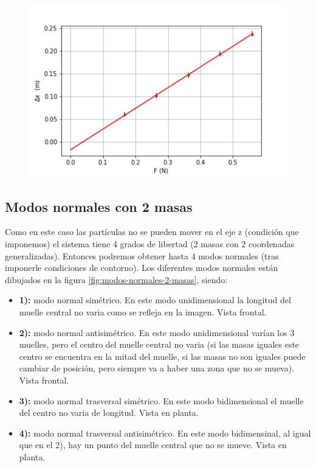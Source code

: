 \documentclass[12pt,a4paper]{article}
\begin{document}
\begin{figure}[h!] \centering
\includegraphics[scale=0.68]{plot4.png}
\end{figure}


\newpage

\subsection{Modos normales con 2 masas}
Como en este caso las partículas no se pueden mover en el eje z (condición que imponemos) el sistema tiene 4 grados de libertad (2 masas con 2 coordenadas generalizadas). Entonces podremos obtener hasta 4 modos normales (tras imponerle condiciones de contorno). Los diferentes modos normales están dibujados en la figura \ref{fig:modos-normales-2-masas}, siendo:
\begin{itemize}
\item \textbf{1):} modo normal simétrico. En este modo unidimensional la longitud del muelle central no varia como se refleja en la imagen. Vista frontal.
\item \textbf{2):} modo normal antisimétrico. En este modo unidimensional varían los 3 muelles, pero el centro del muelle central no varia (si las masas iguales este centro se encuentra en la mitad del muelle, si las masas no son iguales puede cambiar de posición, pero siempre va a haber una zona que no se mueva). Vista frontal.
\item \textbf{3):} modo normal trasversal simétrico. En este modo bidimensional el muelle del centro no varia de longitud. Vista en planta. 
\item  \textbf{4):} modo normal trasversal antisimétrico. En este modo bidimensinal, al igual que en el 2), hay un punto del muelle central que no se mueve. Vista en planta.
\end{itemize}
\end{document}
